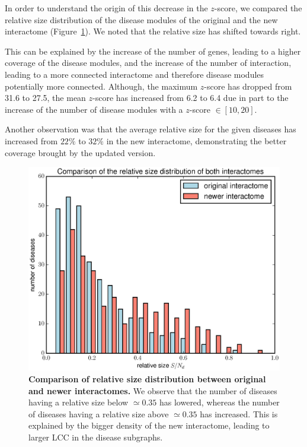 \documentclass[letterpaper]{article}
\begin{document}
	In order to understand the origin of this decrease in the $z$-score, we compared the relative size
	distribution of the disease modules of the original and the new interactome
	(Figure~\ref{fig:rel sizes comparison}). We noted that the relative size has shifted towards right.

	This can be explained by the increase of the number of genes, leading to a higher coverage of the disease
	modules, and the increase of the number of interaction, leading to a more connected interactome and
	therefore disease modules potentially more connected. Although, the maximum $z$-score has dropped from
	31.6 to 27.5, the mean $z$-score has increased from 6.2 to 6.4 due in part to the increase of the number
	of disease modules with a $z$-score $\in [10, 20]$.

	Another observation was that the average relative size for the given diseases has increased from $22\%$
	to $32\%$ in the new interactome, demonstrating the better coverage brought by the updated version.

	\begin{figure}[!h]
		\centering
		\includegraphics[width=.5\textwidth]{images/rel_sizes_comparison.eps}
		\caption{{\bf Comparison of relative size distribution between original and newer interactomes.}
		We observe that the number of diseases having a relative size below $\simeq 0.35$ has lowered, whereas the number
		of diseases having a relative size above $\simeq 0.35$ has increased. This is explained by the bigger density of
		the new interactome, leading to larger LCC in the disease subgraphs.
		\label{fig:rel sizes comparison}}
	\end{figure}
\end{document}
